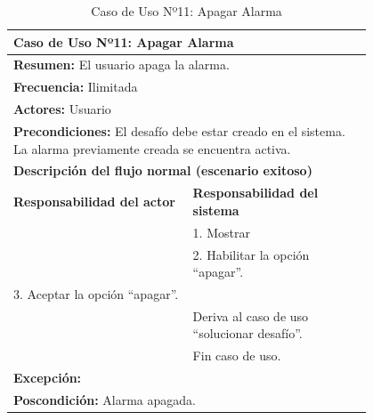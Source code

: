 \begin{table}[H]
    \centering
    \caption{Caso de Uso Nº11: Apagar Alarma}
    
    \begin{tabular}{| p{0.4\linewidth} | p{0.4\linewidth} |}
        \hline
        \multicolumn{2}{|l|}{\textbf{Caso de Uso Nº11:} Apagar Alarma} \\
        \hline
        \multicolumn{2}{|l|}{\textbf{Resumen:} El usuario apaga la alarma.} \\
        \hline
        \multicolumn{2}{|l|}{\textbf{Frecuencia:} Ilimitada} \\
        \hline
        \multicolumn{2}{|l|}{\textbf{Actores:} Usuario} \\
        \hline
        \multicolumn{2}{|p{0.8\linewidth}|}{\textbf{Precondiciones:} El desafío debe estar creado en el sistema. La alarma previamente creada se encuentra activa.} \\
        \hline
        \multicolumn{2}{|l|}{\textbf{Descripción del flujo normal (escenario exitoso)} } \\
        \hline
        \textbf{Responsabilidad del actor} & \textbf{Responsabilidad del sistema} \\
        & 1. Mostrar \\
        & 2. Habilitar la opción ``apagar”. \\
        3. Aceptar la opción ``apagar”. \\
        & Deriva al caso de uso ``solucionar desafío”. \\
        & Fin caso de uso. \\
        \hline
        \multicolumn{2}{|l|}{\textbf{Excepción:}} \\
        \hline
        \multicolumn{2}{|l|}{\textbf{Poscondición:} Alarma apagada.} \\
        \hline
    \end{tabular}

    \label{table:11}
\end{table}

